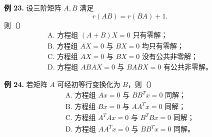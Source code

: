 \begin{problemblock}
\textbf{例 23.} 设三阶矩阵 \(A,B\) 满足
\[
r(AB)=r(BA)+1.
\]
则（\quad）
\[
\begin{array}{l}
\text{A. 方程组 }(A+B)X=0\text{ 只有零解；}\\
\text{B. 方程组 }AX=0\text{ 与 }BX=0\text{ 均只有零解；}\\
\text{C. 方程组 }AX=0\text{ 与 }BX=0\text{ 没有公共非零解；}\\
\text{D. 方程组 }ABAX=0\text{ 与 }BABX=0\text{ 有公共非零解。}
\end{array}
\]
\end{problemblock}
\begin{solutionblock}
\end{solutionblock}

\begin{problemblock}
\textbf{例 24.} 若矩阵 \(A\) 可经初等行变换化为 \(B\)，则（\quad）
\[
\begin{array}{l}
\text{A. 方程组 }Ax=0\text{ 与 }BB^Tx=0\text{ 同解；}\\
\text{B. 方程组 }Bx=0\text{ 与 }AA^Tx=0\text{ 同解；}\\
\text{C. 方程组 }A^TAx=0\text{ 与 }B^TBx=0\text{ 同解；}\\
\text{D. 方程组 }AA^Tx=0\text{ 与 }BB^Tx=0\text{ 同解。}
\end{array}
\]
\end{problemblock}
\begin{solutionblock}
\end{solutionblock}

